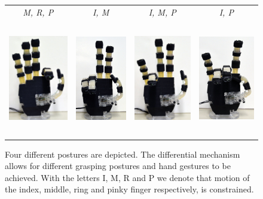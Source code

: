 \begin{figure}[ht]
\begin{center}
\begin{tabular}{ c c c c }
{\it{M, R, P}} & {\it{I, M}} & {\it{I, M, P}} & {\it{I, P}}\\
\includegraphics[height=5cm]{figures/paper_images/index_free.jpg}&
\includegraphics[height=5cm]{figures/paper_images/peace.jpg}& 
\includegraphics[height=5cm]{figures/paper_images/ring_free.jpg}&
\includegraphics[height=5cm]{figures/paper_images/metal.jpg}\\
\end{tabular}
\end{center}
\caption{Four different postures are depicted. The differential mechanism allows for different grasping postures and hand gestures to be achieved. With the letters I, M, R and P we denote that motion of the index, middle, ring and pinky finger respectively, is constrained.} 
\label{Free}
\end{figure}

